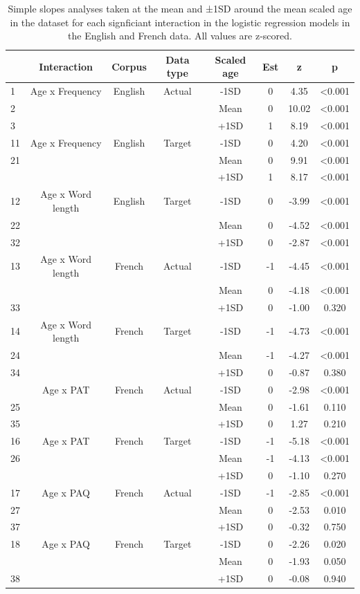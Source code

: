 \documentclass[
  english,
  man,floatsintext]{apa6}
\begin{document}
\begin{longtable}[t]{lccccccc}
\caption{\label{tab:table-all-slopes}Simple slopes analyses taken at the mean and ±1SD around the mean scaled age in the dataset for each signficiant interaction in the logistic regression models in the English and French data. All values are z-scored.}\\
\toprule
  & Interaction & Corpus & Data type & Scaled age & Est & z & p\\
\midrule
1 & Age x Frequency & English & Actual & -1SD & 0 & 4.35 & <0.001\\
2 &  &  &  & Mean & 0 & 10.02 & <0.001\\
3 &  &  &  & +1SD & 1 & 8.19 & <0.001\\
\midrule
11 & Age x Frequency & English & Target & -1SD & 0 & 4.20 & <0.001\\
21 &  &  &  & Mean & 0 & 9.91 & <0.001\\
\addlinespace
31 &  &  &  & +1SD & 1 & 8.17 & <0.001\\
\midrule
12 & Age x Word length & English & Target & -1SD & 0 & -3.99 & <0.001\\
22 &  &  &  & Mean & 0 & -4.52 & <0.001\\
32 &  &  &  & +1SD & 0 & -2.87 & <0.001\\
\midrule
13 & Age x Word length & French & Actual & -1SD & -1 & -4.45 & <0.001\\
\addlinespace
23 &  &  &  & Mean & 0 & -4.18 & <0.001\\
33 &  &  &  & +1SD & 0 & -1.00 & 0.320\\
\midrule
14 & Age x Word length & French & Target & -1SD & -1 & -4.73 & <0.001\\
24 &  &  &  & Mean & -1 & -4.27 & <0.001\\
34 &  &  &  & +1SD & 0 & -0.87 & 0.380\\
\midrule
\addlinespace
15 & Age x PAT & French & Actual & -1SD & 0 & -2.98 & <0.001\\
25 &  &  &  & Mean & 0 & -1.61 & 0.110\\
35 &  &  &  & +1SD & 0 & 1.27 & 0.210\\
\midrule
16 & Age x PAT & French & Target & -1SD & -1 & -5.18 & <0.001\\
26 &  &  &  & Mean & -1 & -4.13 & <0.001\\
\addlinespace
36 &  &  &  & +1SD & 0 & -1.10 & 0.270\\
\midrule
17 & Age x PAQ & French & Actual & -1SD & -1 & -2.85 & <0.001\\
27 &  &  &  & Mean & 0 & -2.53 & 0.010\\
37 &  &  &  & +1SD & 0 & -0.32 & 0.750\\
\midrule
18 & Age x PAQ & French & Target & -1SD & 0 & -2.26 & 0.020\\
\addlinespace
28 &  &  &  & Mean & 0 & -1.93 & 0.050\\
38 &  &  &  & +1SD & 0 & -0.08 & 0.940\\
\bottomrule
\end{longtable}
\end{document}
